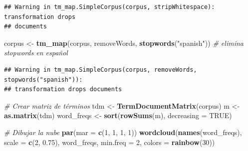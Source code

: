 \documentclass[
]{article}
\newenvironment{Shaded}{\begin{snugshade}}{\end{snugshade}}
\newcommand{\AttributeTok}[1]{\textcolor[rgb]{0.13,0.29,0.53}{#1}}
\newcommand{\CommentTok}[1]{\textcolor[rgb]{0.56,0.35,0.01}{\textit{#1}}}
\newcommand{\ConstantTok}[1]{\textcolor[rgb]{0.56,0.35,0.01}{#1}}
\newcommand{\DecValTok}[1]{\textcolor[rgb]{0.00,0.00,0.81}{#1}}
\newcommand{\FloatTok}[1]{\textcolor[rgb]{0.00,0.00,0.81}{#1}}
\newcommand{\FunctionTok}[1]{\textcolor[rgb]{0.13,0.29,0.53}{\textbf{#1}}}
\newcommand{\NormalTok}[1]{#1}
\newcommand{\OtherTok}[1]{\textcolor[rgb]{0.56,0.35,0.01}{#1}}
\newcommand{\StringTok}[1]{\textcolor[rgb]{0.31,0.60,0.02}{#1}}
\begin{document}
\begin{verbatim}
## Warning in tm_map.SimpleCorpus(corpus, stripWhitespace): transformation drops
## documents
\end{verbatim}

\begin{Shaded}
\begin{Highlighting}[]
\NormalTok{corpus }\OtherTok{\textless{}{-}} \FunctionTok{tm\_map}\NormalTok{(corpus, removeWords, }\FunctionTok{stopwords}\NormalTok{(}\StringTok{"spanish"}\NormalTok{))    }\CommentTok{\# elimina stopwords en español}
\end{Highlighting}
\end{Shaded}

\begin{verbatim}
## Warning in tm_map.SimpleCorpus(corpus, removeWords, stopwords("spanish")):
## transformation drops documents
\end{verbatim}

\begin{Shaded}
\begin{Highlighting}[]
\CommentTok{\# Crear matriz de términos}
\NormalTok{tdm }\OtherTok{\textless{}{-}} \FunctionTok{TermDocumentMatrix}\NormalTok{(corpus)}
\NormalTok{m }\OtherTok{\textless{}{-}} \FunctionTok{as.matrix}\NormalTok{(tdm)}
\NormalTok{word\_freqs }\OtherTok{\textless{}{-}} \FunctionTok{sort}\NormalTok{(}\FunctionTok{rowSums}\NormalTok{(m), }\AttributeTok{decreasing =} \ConstantTok{TRUE}\NormalTok{)}

\CommentTok{\# Dibujar la nube}
\FunctionTok{par}\NormalTok{(}\AttributeTok{mar =} \FunctionTok{c}\NormalTok{(}\DecValTok{1}\NormalTok{, }\DecValTok{1}\NormalTok{, }\DecValTok{1}\NormalTok{, }\DecValTok{1}\NormalTok{))}
\FunctionTok{wordcloud}\NormalTok{(}\FunctionTok{names}\NormalTok{(word\_freqs), }\AttributeTok{scale =} \FunctionTok{c}\NormalTok{(}\DecValTok{2}\NormalTok{, }\FloatTok{0.75}\NormalTok{), word\_freqs, }\AttributeTok{min.freq =} \DecValTok{2}\NormalTok{, }
          \AttributeTok{colors =} \FunctionTok{rainbow}\NormalTok{(}\DecValTok{30}\NormalTok{))}
\end{Highlighting}
\end{Shaded}
\end{document}
